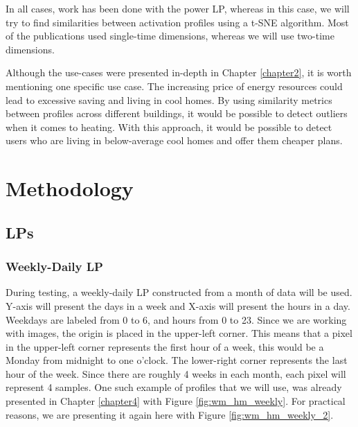 In all cases, work has been done with the power LP, whereas in this case, we will try to find similarities between activation profiles using a t-SNE algorithm.
Most of the publications used single-time dimensions, whereas we will use two-time dimensions.

Although the use-cases were presented in-depth in Chapter \ref{chapter2}, it is worth mentioning one specific use case.
The increasing price of energy resources could lead to excessive saving and living in cool homes.
By using similarity metrics between profiles across different buildings, it would be possible to detect outliers when it comes to heating.
With this approach, it would be possible to detect users who are living in below-average cool homes and offer them cheaper plans.

\section{Methodology}

\subsection{LPs}

\subsubsection{Weekly-Daily LP}

During testing, a weekly-daily LP constructed from a month of data will be used.
Y-axis will present the days in a week and X-axis will present the hours in a day.
Weekdays are labeled from 0 to 6, and hours from 0 to 23.
Since we are working with images, the origin is placed in the upper-left corner.
This means that a pixel in the upper-left corner represents the first hour of a week, this would be a Monday from midnight to one o'clock.
The lower-right corner represents the last hour of the week.
Since there are roughly 4 weeks in each month, each pixel will represent 4 samples.
One such example of profiles that we will use, was already presented in Chapter \ref{chapter4} with Figure \ref{fig:wm_hm_weekly}.
For practical reasons, we are presenting it again here with Figure \ref{fig:wm_hm_weekly_2}.

